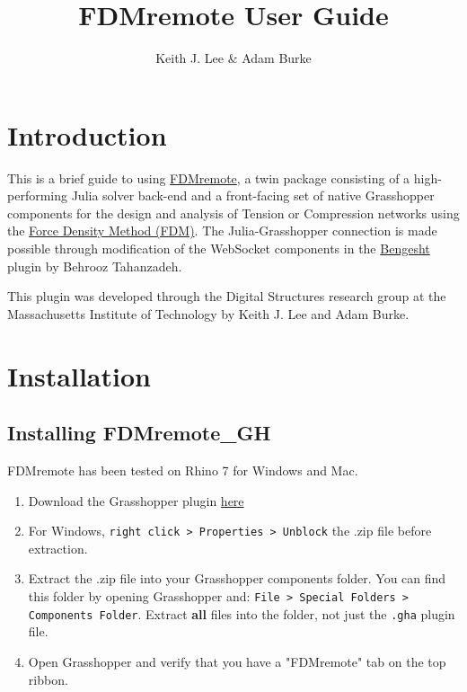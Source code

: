 \documentclass{ol-softwaremanual}
\title{FDMremote User Guide}
\author{Keith J. Lee \& Adam Burke}
\begin{document}
\maketitle

\tableofcontents
\newpage

\section{Introduction}
This is a brief guide to using \href{https://github.com/keithjlee/FDMremote_GH}{FDMremote}, a twin package consisting of a high-performing Julia solver back-end and a front-facing set of native Grasshopper components for the design and analysis of Tension or Compression networks using the \href{https://www.sciencedirect.com/science/article/abs/pii/0045782574900450}{Force Density Method (FDM)}. The Julia-Grasshopper connection is made possible through modification of the WebSocket components in 
 the \href{https://www.food4rhino.com/en/app/bengesht}{Bengesht} plugin by Behrooz Tahanzadeh.

This plugin was developed through the Digital Structures research group at the Massachusetts Institute of Technology by Keith J. Lee and Adam Burke. 

\section{Installation} \label{sec:installation}

\subsection{Installing FDMremote\_GH} \label{installgh}
FDMremote has been tested on Rhino 7 for Windows and Mac.

\begin{enumerate}
    \item Download the Grasshopper plugin \href{https://www.food4rhino.com/en/app/fdmremote?lang=en}{here}
    \item For Windows, \texttt{right click > Properties > Unblock} the .zip file before extraction.
    \item Extract the .zip file into your Grasshopper components folder. You can find this folder by opening Grasshopper and: \texttt{File > Special Folders > Components Folder}.
 {\color{kpink}  \subitem Extract \textbf{all} files into the folder, not just the \texttt{.gha} plugin file.}
    \item Open Grasshopper and verify that you have a "FDMremote" tab on the top ribbon.
\end{enumerate}
\end{document}
